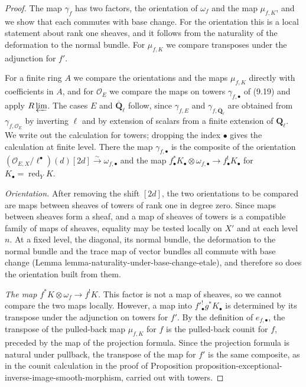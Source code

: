 \documentclass[11pt]{article}
\begin{document}
\begin{proof}[{Proof}]\label{bp79}%
The map \(\gamma_f\) has two factors, the orientation of \(\omega_f\) and the map \(\mu_{f,K}\), and we show that each commutes with base change. For the orientation this is a local statement about rank one sheaves, and it follows from the naturality of the deformation to the normal bundle. For \(\mu_{f,K}\) we compare transposes under the adjunction for \(f'\).

For a finite ring \(A\) we compare the orientations and the maps \(\mu_{f,K}\) directly with coefficients in \(A\), and for \(\mathcal O_E\) we compare the maps on towers \(\gamma_{f,\bullet}\) of (9.19) and apply \(R\varprojlim\). The cases \(E\) and \(\overline{\mathbf Q}_\ell\) follow, since \(\gamma_{f,E}\) and \(\gamma_{f,\overline{\mathbf Q}_\ell}\) are obtained from \(\gamma_{f,\mathcal O_E}\) by inverting \(\ell\) and by extension of scalars from a finite extension of \(\mathbf Q_\ell\). We write out the calculation for towers; dropping the index \(\bullet\) gives the calculation at finite level. There the map \(\gamma_{f,\bullet}\) is the composite of the orientation \((\mathcal O_{E,X}/\ell^\bullet)(d)[2d]\xrightarrow{\sim}\omega_{f,\bullet}\) and the map \(f_\bullet^*K_\bullet\otimes\omega_{f,\bullet}\to f_\bullet^!K_\bullet\) for \(K_\bullet=\operatorname{red}_YK\).

\emph{Orientation.} After removing the shift \([2d]\), the two orientations to be compared are maps between sheaves of towers of rank one in degree zero. Since maps between sheaves form a sheaf, and a map of sheaves of towers is a compatible family of maps of sheaves, equality may be tested locally on \(X'\) and at each level \(n\). At a fixed level, the diagonal, its normal bundle, the deformation to the normal bundle and the trace map of vector bundles all commute with base change (Lemma lemma-naturality-under-base-change-etale), and therefore so does the orientation built from them.

\emph{The map \(f^*K\otimes\omega_f\to f^!K\).} This factor is not a map of sheaves, so we cannot compare the two maps locally. However, a map into \(f'^!_\bullet g^*K_\bullet\) is determined by its transpose under the adjunction on towers for \(f'\). By the definition of \(e_{f,\bullet}\), the transpose of the pulled-back map \(\mu_{f,K}\) for \(f\) is the pulled-back counit for \(f\), preceded by the map of the projection formula. Since the projection formula is natural under pullback, the transpose of the map for \(f'\) is the same composite, as in the counit calculation in the proof of Proposition proposition-exceptional-inverse-image-smooth-morphism, carried out with towers.
\end{proof}
\end{document}
